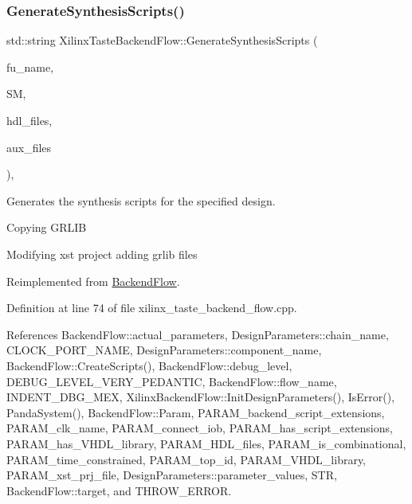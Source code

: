 \subsubsection{\texorpdfstring{Generate\+Synthesis\+Scripts()}{GenerateSynthesisScripts()}}
{\footnotesize\ttfamily std\+::string Xilinx\+Taste\+Backend\+Flow\+::\+Generate\+Synthesis\+Scripts (\begin{DoxyParamCaption}\item[{const std\+::string \&}]{fu\+\_\+name,  }\item[{const \hyperlink{structural__manager_8hpp_ab3136f0e785d8535f8d252a7b53db5b5}{structural\+\_\+manager\+Ref}}]{SM,  }\item[{const std\+::list$<$ std\+::string $>$ \&}]{hdl\+\_\+files,  }\item[{const std\+::list$<$ std\+::string $>$ \&}]{aux\+\_\+files }\end{DoxyParamCaption})\hspace{0.3cm}{\ttfamily [override]}, {\ttfamily [virtual]}}



Generates the synthesis scripts for the specified design. 

Copying G\+R\+L\+IB

Modifying xst project adding grlib files 

Reimplemented from \hyperlink{classBackendFlow_a384ea03eb37c09770d9d72c013793f54}{Backend\+Flow}.



Definition at line 74 of file xilinx\+\_\+taste\+\_\+backend\+\_\+flow.\+cpp.



References Backend\+Flow\+::actual\+\_\+parameters, Design\+Parameters\+::chain\+\_\+name, C\+L\+O\+C\+K\+\_\+\+P\+O\+R\+T\+\_\+\+N\+A\+ME, Design\+Parameters\+::component\+\_\+name, Backend\+Flow\+::\+Create\+Scripts(), Backend\+Flow\+::debug\+\_\+level, D\+E\+B\+U\+G\+\_\+\+L\+E\+V\+E\+L\+\_\+\+V\+E\+R\+Y\+\_\+\+P\+E\+D\+A\+N\+T\+IC, Backend\+Flow\+::flow\+\_\+name, I\+N\+D\+E\+N\+T\+\_\+\+D\+B\+G\+\_\+\+M\+EX, Xilinx\+Backend\+Flow\+::\+Init\+Design\+Parameters(), Is\+Error(), Panda\+System(), Backend\+Flow\+::\+Param, P\+A\+R\+A\+M\+\_\+backend\+\_\+script\+\_\+extensions, P\+A\+R\+A\+M\+\_\+clk\+\_\+name, P\+A\+R\+A\+M\+\_\+connect\+\_\+iob, P\+A\+R\+A\+M\+\_\+has\+\_\+script\+\_\+extensions, P\+A\+R\+A\+M\+\_\+has\+\_\+\+V\+H\+D\+L\+\_\+library, P\+A\+R\+A\+M\+\_\+\+H\+D\+L\+\_\+files, P\+A\+R\+A\+M\+\_\+is\+\_\+combinational, P\+A\+R\+A\+M\+\_\+time\+\_\+constrained, P\+A\+R\+A\+M\+\_\+top\+\_\+id, P\+A\+R\+A\+M\+\_\+\+V\+H\+D\+L\+\_\+library, P\+A\+R\+A\+M\+\_\+xst\+\_\+prj\+\_\+file, Design\+Parameters\+::parameter\+\_\+values, S\+TR, Backend\+Flow\+::target, and T\+H\+R\+O\+W\+\_\+\+E\+R\+R\+OR.


